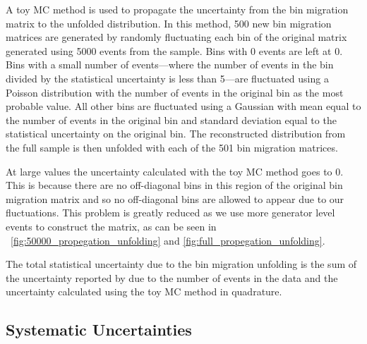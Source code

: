 A toy MC method is used to propagate the uncertainty from the bin migration
matrix to the unfolded distribution. In this method, \num{500} new bin
migration matrices are generated by randomly fluctuating each bin of the
original matrix generated using \num{5000} events from the \POWHEG sample. Bins
with \num{0} events are left at \num{0}. Bins with a small number of
events---where the number of events in the bin divided by the statistical
uncertainty is less than \num{5}---are fluctuated using a Poisson distribution
with the number of events in the original bin as the most probable value. All
other bins are fluctuated using a Gaussian with mean equal to the number of
events in the original bin and standard deviation equal to the statistical
uncertainty on the original bin. The reconstructed \phistar distribution from
the full \MADGRAPH sample is then unfolded with each of the \num{501} bin
migration matrices. 


At large \phistar values the uncertainty calculated with the toy MC method goes
to \num{0}. This is because there are no off-diagonal bins in this region of
the original bin migration matrix and so no off-diagonal bins are allowed to
appear due to our fluctuations. This problem is greatly reduced as we use more
generator level events to construct the matrix, as can be seen in
\FIGS~\ref{fig:50000_propegation_unfolding} and
\ref{fig:full_propegation_unfolding}.


The total statistical uncertainty due to the bin migration unfolding is the
sum of the uncertainty reported by \RooUnfold due to the number of events in
the data and the uncertainty calculated using the toy MC method in quadrature.

\subsection{Systematic Uncertainties}
\label{ssec:unfolding_systematic_uncertainties}

